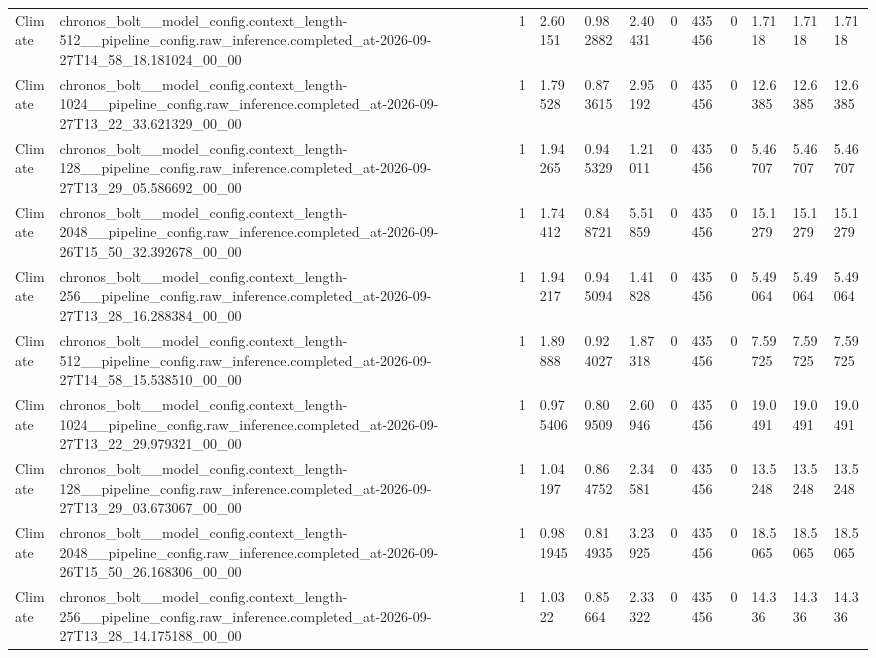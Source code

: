 \begin{tabular}{llllllllllll}
Climate & chronos\_bolt\_\_model\_config.context\_length-512\_\_pipeline\_config.raw\_inference.completed\_at-2026-09-27T14\_58\_18.181024\_00\_00 & 1 & 2.60151 & 0.982882 & 2.40431 & 0 & 435456 & 0 & 1.7118 & 1.7118 & 1.7118 \\
Climate & chronos\_bolt\_\_model\_config.context\_length-1024\_\_pipeline\_config.raw\_inference.completed\_at-2026-09-27T13\_22\_33.621329\_00\_00 & 1 & 1.79528 & 0.873615 & 2.95192 & 0 & 435456 & 0 & 12.6385 & 12.6385 & 12.6385 \\
Climate & chronos\_bolt\_\_model\_config.context\_length-128\_\_pipeline\_config.raw\_inference.completed\_at-2026-09-27T13\_29\_05.586692\_00\_00 & 1 & 1.94265 & 0.945329 & 1.21011 & 0 & 435456 & 0 & 5.46707 & 5.46707 & 5.46707 \\
Climate & chronos\_bolt\_\_model\_config.context\_length-2048\_\_pipeline\_config.raw\_inference.completed\_at-2026-09-26T15\_50\_32.392678\_00\_00 & 1 & 1.74412 & 0.848721 & 5.51859 & 0 & 435456 & 0 & 15.1279 & 15.1279 & 15.1279 \\
Climate & chronos\_bolt\_\_model\_config.context\_length-256\_\_pipeline\_config.raw\_inference.completed\_at-2026-09-27T13\_28\_16.288384\_00\_00 & 1 & 1.94217 & 0.945094 & 1.41828 & 0 & 435456 & 0 & 5.49064 & 5.49064 & 5.49064 \\
Climate & chronos\_bolt\_\_model\_config.context\_length-512\_\_pipeline\_config.raw\_inference.completed\_at-2026-09-27T14\_58\_15.538510\_00\_00 & 1 & 1.89888 & 0.924027 & 1.87318 & 0 & 435456 & 0 & 7.59725 & 7.59725 & 7.59725 \\
Climate & chronos\_bolt\_\_model\_config.context\_length-1024\_\_pipeline\_config.raw\_inference.completed\_at-2026-09-27T13\_22\_29.979321\_00\_00 & 1 & 0.975406 & 0.809509 & 2.60946 & 0 & 435456 & 0 & 19.0491 & 19.0491 & 19.0491 \\
Climate & chronos\_bolt\_\_model\_config.context\_length-128\_\_pipeline\_config.raw\_inference.completed\_at-2026-09-27T13\_29\_03.673067\_00\_00 & 1 & 1.04197 & 0.864752 & 2.34581 & 0 & 435456 & 0 & 13.5248 & 13.5248 & 13.5248 \\
Climate & chronos\_bolt\_\_model\_config.context\_length-2048\_\_pipeline\_config.raw\_inference.completed\_at-2026-09-26T15\_50\_26.168306\_00\_00 & 1 & 0.981945 & 0.814935 & 3.23925 & 0 & 435456 & 0 & 18.5065 & 18.5065 & 18.5065 \\
Climate & chronos\_bolt\_\_model\_config.context\_length-256\_\_pipeline\_config.raw\_inference.completed\_at-2026-09-27T13\_28\_14.175188\_00\_00 & 1 & 1.0322 & 0.85664 & 2.33322 & 0 & 435456 & 0 & 14.336 & 14.336 & 14.336 \\

\end{tabular}
